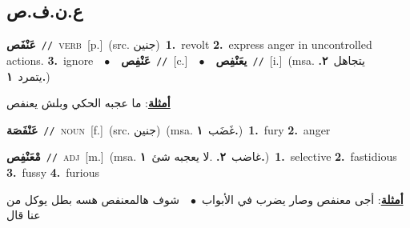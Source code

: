 \documentclass[10pt,a4paper,twoside]{article} %
\begin{document}
\begin{multicols}{2}
\vspace{-3mm}
\subsection*{\color{blue}\foreignlanguage{arabic}{ع.ن.ف.ص}\color{blue}{}} 

{\setlength\topsep{0pt}\textbf{\foreignlanguage{arabic}{عَنْفَص}}\ {\color{gray}\texttt{//}\color{black}}\ \textsc{verb}\ [p.]\ (src. \color{gray}\foreignlanguage{arabic}{جنين}\color{black})\ \textbf{1.}~revolt  \textbf{2.}~express anger in uncontrolled actions.  \textbf{3.}~ignore\ \ $\bullet$\ \ \setlength\topsep{0pt}\textbf{\foreignlanguage{arabic}{عَنْفِص}}\ {\color{gray}\texttt{//}\color{black}}\ [c.]\ \ $\bullet$\ \ \setlength\topsep{0pt}\textbf{\foreignlanguage{arabic}{يعَنْفِص}}\ {\color{gray}\texttt{//}\color{black}}\ [i.]\ \color{gray}(msa. \foreignlanguage{arabic}{يتجاهل}~\foreignlanguage{arabic}{\textbf{٢.}}  \foreignlanguage{arabic}{يتمرد}~\foreignlanguage{arabic}{\textbf{١.}})\color{black}\  \begin{flushright}\color{gray}\foreignlanguage{arabic}{\textbf{\underline{\foreignlanguage{arabic}{أمثلة}}}: ما عجبه الحكي وبلش يعنفص}\end{flushright}\color{black}} \vspace{2mm}

{\setlength\topsep{0pt}\textbf{\foreignlanguage{arabic}{عَنْفَصَة}}\ {\color{gray}\texttt{//}\color{black}}\ \textsc{noun}\ [f.]\ (src. \color{gray}\foreignlanguage{arabic}{جنين}\color{black})\ \color{gray}(msa. \foreignlanguage{arabic}{غَضَب}~\foreignlanguage{arabic}{\textbf{١.}})\color{black}\ \textbf{1.}~fury  \textbf{2.}~anger\ } \vspace{2mm}

{\setlength\topsep{0pt}\textbf{\foreignlanguage{arabic}{مْعَنْفِص}}\ {\color{gray}\texttt{//}\color{black}}\ \textsc{adj}\ [m.]\ \color{gray}(msa. \foreignlanguage{arabic}{غاضب}~\foreignlanguage{arabic}{\textbf{٢.}}  .\foreignlanguage{arabic}{لا يعجبه شئ}~\foreignlanguage{arabic}{\textbf{١.}})\color{black}\ \textbf{1.}~selective  \textbf{2.}~fastidious  \textbf{3.}~fussy  \textbf{4.}~furious\  \begin{flushright}\color{gray}\foreignlanguage{arabic}{\textbf{\underline{\foreignlanguage{arabic}{أمثلة}}}: أجى معنفص وصار يضرب في الأبواب\ $\bullet$\ \  شوف هالمعنفص هسه بطل يوكل من عنا قال}\end{flushright}\color{black}} \vspace{2mm}


\end{multicols}
\end{document}
